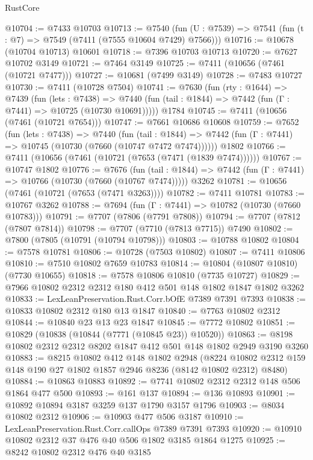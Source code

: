 \begin{lexlean}{RustCore}
\begin{coremodule}
@10704 := @7433 @10703
@10713 := @7540
    (fun (U : @7539) => @7541 (fun (t : @7) => @7549 (@7411 (@7555 @10604 @7429) @7566)))
@10716 := @10678 (@10704 @10713) @10601
@10718 := @7396 @10703 @10713
@10720 := @7627 @10702 @3149
@10721 := @7464 @3149
@10725 := @7411 (@10656 (@7461 (@10721 @7477)))
@10727 := @10681 (@7499 @3149)
@10728 := @7483 @10727
@10730 := @7411 (@10728 @7504)
@10741 := @7630
    (fun (rty : @1644) =>
    @7439
      (fun (lets : @7438) =>
      @7440 (fun (tail : @1844) => @7442 (fun (Γ : @7441) => @10725 (@10730 @10691)))))
    @1784
@10745 := @7411 (@10656 (@7461 (@10721 @7654)))
@10747 := @7661 @10686 @10608
@10759 := @7652
    (fun (lets : @7438) =>
    @7440
      (fun (tail : @1844) =>
      @7442 (fun (Γ : @7441) => @10745 (@10730 (@7660 (@10747 @7472 @7474))))))
    @1802
@10766 := @7411 (@10656 (@7461 (@10721 (@7653 (@7471 (@1839 @7474))))))
@10767 := @10747 @1802
@10776 := @7676
    (fun (tail : @1844) => @7442 (fun (Γ : @7441) => @10766 (@10730 (@7660 (@10767 @7474)))))
    @3262
@10781 := @10656 (@7461 (@10721 (@7653 (@7471 @3263))))
@10782 := @7411 @10781
@10783 := @10767 @3262
@10788 := @7694 (fun (Γ : @7441) => @10782 (@10730 (@7660 @10783)))
@10791 := @7707 (@7806 (@7791 @7808))
@10794 := @7707 (@7812 (@7807 @7814))
@10798 := @7707 (@7710 (@7813 @7715)) @7490
@10802 := @7800 (@7805 (@10791 (@10794 @10798)))
@10803 := @10788 @10802
@10804 := @7578 @10781
@10806 := @10728 (@7503 @10802)
@10807 := @7411 @10806
@10810 := @7510 @10802 @7659 @10783
@10814 := @10804 (@10807 @10810) (@7730 @10655)
@10818 := @7578 @10806 @10810 (@7735 @10727)
@10829 := @7966 @10802 @2312 @2312 @180 @412 @501 @148 @1802 @1847 @1802 @3262
@10833 := LexLeanPreservation.Rust.Corr.bOfE @7389 @7391 @7393
@10838 := @10833 @10802 @2312 @180 @13 @1847
@10840 := @7763 @10802 @2312
@10844 := @10840 @23 @13 @23 @1847
@10845 := @7772 @10802
@10851 := @10829 (@10838 (@10844 (@7771 (@10845 @23)) @10520))
@10863 := @8198 @10802 @2312 @2312 @8202 @1847 @412 @501 @148 @1802 @2949 @3190 @3260
@10883 := @8215
    @10802
    @412
    @148
    @1802
    @2948
    (@8224 @10802 @2312 @159 @148 @190 @27 @1802 @1857 @2946 @8236 (@8142 @10802 @2312) @8480)
@10884 := @10863 @10883
@10892 := @7741 @10802 @2312 @2312 @148 @506 @1864 @477 @500
@10893 := @161 @137
@10894 := @136 @10893
@10901 := @10892 @10894 @3187 @3259 @137 @1790 @3157 @1796
@10903 := @8034 @10802 @2312
@10906 := @10903 @477 @506 @3187
@10910 := LexLeanPreservation.Rust.Corr.callOps @7389 @7391 @7393
@10920 := @10910 @10802 @2312 @37 @476 @40 @506 @1802 @3185 @1864 @1275
@10925 := @8242 @10802 @2312 @476 @40 @3185

\end{coremodule}
\end{lexlean}
